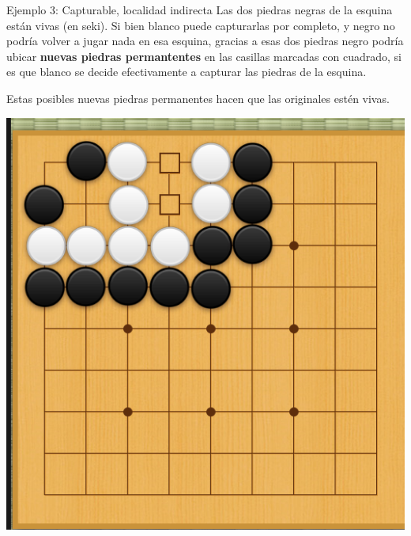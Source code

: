 \documentclass{beamer}
\begin{document}
\begin{frame}{Ejemplo 3: Capturable, localidad indirecta}
    Las dos piedras negras de la esquina están vivas (en seki). Si bien blanco puede capturarlas por completo, y negro no podría volver a jugar nada en esa esquina, gracias a esas dos piedras 
     negro podría ubicar \textbf{nuevas piedras permantentes} en las casillas marcadas con cuadrado, si es que blanco se decide efectivamente a capturar las piedras de la esquina. 
     
     Estas posibles
     nuevas piedras permanentes hacen que las originales estén vivas.
    
    \includegraphics[scale=0.3]{capturable2.png}
\end{frame}
\end{document}
